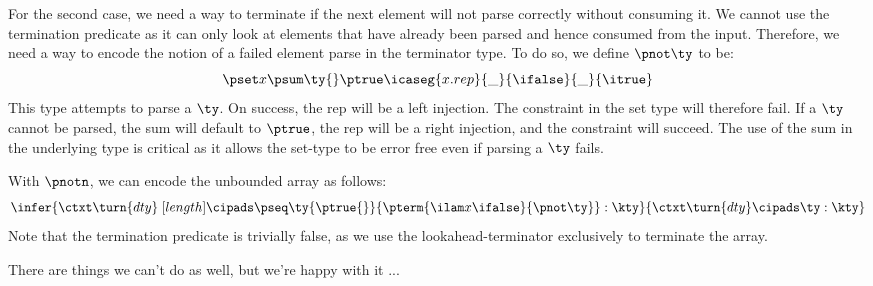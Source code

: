 For the second case, we need a way to terminate if the next element
will not parse correctly without consuming it. We cannot use the
termination predicate as it can only look at elements that have
already been parsed and hence consumed from the input. Therefore, we
need a way to encode the notion of a failed element parse in the
terminator type. To do so, we define $\pnot \ty$ to be:
 {\small
\[
\pset x {\psum \ty {} \ptrue} {\icaseg {x.rep} {\_}
  {\ifalse} {\_} {\itrue}}
\]}
\noindent
This type attempts to parse a $\ty$. On success, the rep will be a left
injection. The constraint in the set type will therefore fail. If a
$\ty$ cannot be parsed, the sum will default to $\ptrue$, the rep will
be a right injection, and the constraint will succeed. The use of the
sum in the underlying type is critical as it allows the set-type to be
error free even if parsing a $\ty$ fails.

With $\pnotn$, we can encode the unbounded \datascript{} array as
follows:
\[
  \infer{
    \ctxt \turn {dty} \; [{length}] \cipads 
    \pseq \ty {\ptrue{}} {\pterm {\ilam x {} \ifalse} {\pnot \ty}} : \kty
  }{ 
    \ctxt \turn {dty} \cipads \ty : \kty 
  }
\]
Note that the termination predicate is trivially false, as we use the
lookahead-terminator exclusively to terminate the array.


There are things we can't do as well, but we're happy with it ...

